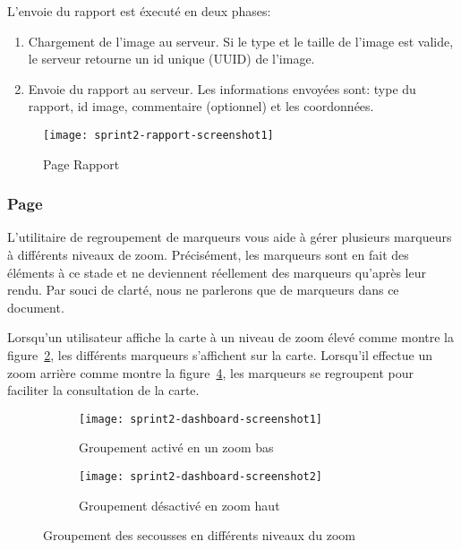 
L'envoie du rapport est éxecuté en deux phases:

\begin{enumerate}
    \item Chargement de l'image au serveur. Si le type et le taille de l'image
        est valide, le serveur retourne un id unique (UUID) de l'image.
    \item Envoie du rapport au serveur. Les informations envoyées sont: type du
        rapport, id image, commentaire (optionnel) et les coordonnées.
\end{enumerate}

\begin{figure}[htbp]
    \centering
    \texttt{[image: sprint2-rapport-screenshot1]}
    \caption{Page Rapport}
\label{fig:sprint2-rapport-screenshot1}
\end{figure}

\subsubsection{Page }

L'utilitaire de regroupement de marqueurs vous aide à gérer plusieurs marqueurs
à différents niveaux de zoom. Précisément, les marqueurs sont en fait des
éléments à ce stade et ne deviennent réellement des marqueurs qu'après leur
rendu. Par souci de clarté, nous ne parlerons que de marqueurs dans ce
document.

Lorsqu'un utilisateur affiche la carte à un niveau de zoom élevé comme montre
la figure~\ref{fig:sprint2-dashboard-screenshot1}, les différents marqueurs
s'affichent sur la carte. Lorsqu'il effectue un zoom arrière comme montre la
figure~\ref{fig:sprint2-dashboard-screenshot2}, les marqueurs se regroupent
pour faciliter la consultation de la carte.

\begin{figure}[htbp]
    \begin{subfigure}{.5\textwidth}
        \centering
        \texttt{[image: sprint2-dashboard-screenshot1]}
        \caption{Groupement activé en un zoom bas}
\label{fig:sprint2-dashboard-screenshot1}
    \end{subfigure}
    \begin{subfigure}{.5\textwidth}
        \centering
        \texttt{[image: sprint2-dashboard-screenshot2]}
        \caption{Groupement désactivé en zoom haut}
\label{fig:sprint2-dashboard-screenshot2}
    \end{subfigure}
    \caption{Groupement des secousses en différents niveaux du zoom}
\end{figure}

